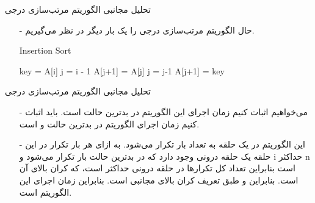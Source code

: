 \begin{frame}{‌تحلیل مجانبی الگوریتم‌ مرتب‌سازی درجی}
\begin{itemize}\itemr
\item[-]
حال الگوریتم مرتب‌سازی درجی را یک بار دیگر در نظر می‌گیریم.
\begin{algorithm}[H]\alglr
  \caption{Insertion Sort} 
  \begin{algorithmic}[1]
    \newline{}
        \State key = A[i]
        \State j = i - 1
          \State A[j+1] = A[j]
          \State j = j-1
        \EndWhile
        \State A[j+1] = key
      \EndFor
  \end{algorithmic}
  \label{alg:insertion-sort}
\end{algorithm}
\end{itemize}
\end{frame}



\begin{frame}{‌تحلیل مجانبی الگوریتم‌ مرتب‌سازی درجی}
\begin{itemize}\itemr
\item[-]
می‌خواهیم اثبات کنیم زمان اجرای این الگوریتم در بدترین حالت
است.
باید اثبات کنیم زمان اجرای الگوریتم 
در بدترین حالت
و
است.
\item[-]
این الگوریتم در یک حلقه
به تعداد
بار تکرار می‌شود. به ازای هر بار تکرار در این حلقه یک حلقه درونی
وجود دارد که در بدترین حالت
بار تکرار می‌شود و i حداکثر n است بنابراین تعداد کل تکرارها در حلقه درونی حداکثر
است، که کران بالای آن
 است. بنابراین
و طبق تعریف کران بالای مجانبی
است.
  بنابراین زمان اجرای این الگوریتم
است.
\end{itemize}
\end{frame}


